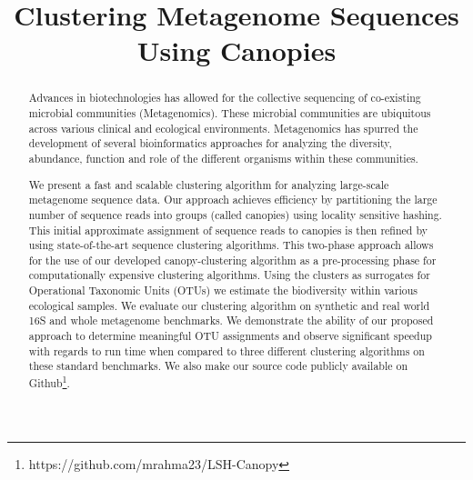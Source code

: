 \documentclass[10pt, conference, compsocconf]{IEEEtran}
\begin{document}
\title{Clustering Metagenome Sequences Using Canopies}

\author{
}
\maketitle

\begin{abstract}
	
Advances in biotechnologies 
has allowed for the 
collective sequencing of co-existing 
microbial communities (Metagenomics). These microbial communities
are ubiquitous 
across various clinical and 
ecological environments. 
%
Metagenomics has 
spurred the development of several 
bioinformatics approaches for analyzing 
the diversity, abundance, function and role of the 
different organisms 
within these communities. 
%


We present 
a fast and scalable 
clustering algorithm
for analyzing 
large-scale metagenome sequence
data. Our approach 
achieves efficiency 
by  
partitioning the large number of sequence reads into 
groups (called canopies) using locality sensitive 
hashing.  This 
initial approximate assignment of sequence reads to 
canopies is then 
refined by using 
state-of-the-art
sequence clustering 
algorithms. This
two-phase 
approach allows for the
use  of 
our developed canopy-clustering algorithm 
as a pre-processing phase for 
computationally expensive 
clustering 
algorithms. Using the clusters as surrogates for 
Operational Taxonomic Units (OTUs) we 
estimate  the biodiversity within 
various ecological  samples.
%
%
We evaluate our clustering 
algorithm on synthetic and real 
world 16S and whole 
metagenome  benchmarks. We demonstrate the ability 
of our proposed approach to  
determine meaningful OTU assignments and observe
significant speedup with regards 
to run time when compared to three 
different clustering algorithms on these 
standard benchmarks. 
We also make our 
source code publicly 
available on Github\footnote{https://github.com/mrahma23/LSH-Canopy}. 




\end{abstract}
\end{document}
